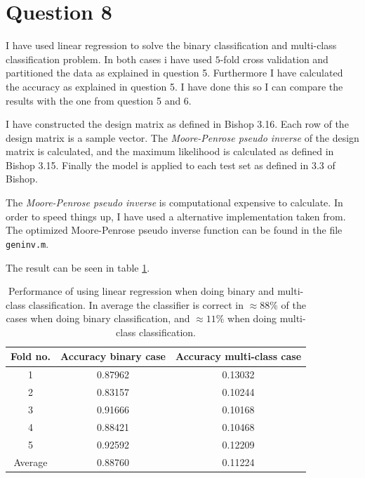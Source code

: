 \documentclass[10pt]{article}
\begin{document}

\section*{Question 8} %
\label{sec:question_8}

I have used linear regression to solve the binary classification and multi-class classification problem. In both cases i have used $5$-fold cross validation and partitioned the data as explained in question 5. Furthermore I have calculated the accuracy as explained in question 5. I have done this so I can compare the results with the one from question 5 and 6.

I have constructed the design matrix as defined in Bishop\cite{Bishop:2006:PRM:1162264} 3.16. Each row of the design matrix is a sample vector. The \emph{Moore-Penrose pseudo inverse} of the design matrix is calculated, and the maximum likelihood is calculated as defined in Bishop 3.15. Finally the model is applied to each test set as defined in 3.3 of Bishop. 

The \emph{Moore-Penrose pseudo inverse} is computational expensive to calculate. In order to speed things up, I have used a alternative implementation taken from\cite{DBLP:journals/corr/abs-0804-4809}. The optimized Moore-Penrose pseudo inverse function can be found in the file \texttt{geninv.m}.

The result can be seen in table \ref{table1}.

\begin{table}
  \begin{center}  
    \begin{tabular}{ | c | c | c |}
      \hline
      Fold no. & Accuracy binary case & Accuracy multi-class case\\
      \hline
      1       &  0.87962  &  0.13032\\
      2       &  0.83157  &  0.10244\\
      3       &  0.91666  &  0.10168\\
      4       &  0.88421  &  0.10468\\
      5       &  0.92592  &  0.12209\\
      \hline
      Average &  0.88760  &  0.11224\\
      \hline      
    \end{tabular}
    \caption{Performance of using linear regression when doing binary and multi-class classification. In average the classifier is correct in $\approx 88\%$ of the cases when doing binary classification, and $\approx 11\%$ when doing multi-class classification.}
    \label{table1}
  \end{center}    
\end{table}   
                                       
\end{document}
